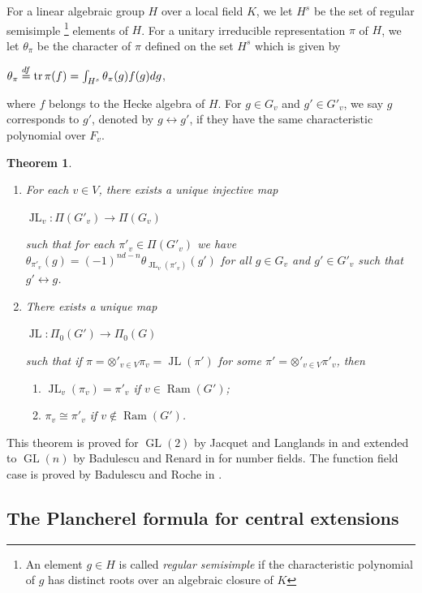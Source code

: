 \documentclass[11pt]{article}
\theoremstyle{plain}
\newtheorem{theorem}{Theorem}[section]
\theoremstyle{remark}
\theoremstyle{definition}
\DeclareMathOperator{\tr}{tr}
\DeclareMathOperator{\GL}{GL}
\DeclareMathOperator{\JL}{JL}
\DeclareMathOperator{\ram}{Ram}
\begin{document}
For a linear algebraic group $H$ over a local field $K$, 
we let $H^s$ be the set of regular semisimple \footnote{An element $g\in H$ is called {\it regular semisimple} if the characteristic polynomial of $g$ has distinct roots over an algebraic closure of $K$} elements of $H$. 
For a unitary irreducible representation $\pi$ of $H$, 
we let $\theta_{\pi}$ be the character of $\pi$ defined on the set $H^s$ which is given by 
\begin{center}
   $\theta_{\pi}\stackrel{\rm df}{=}\tr\pi(f)=\int_{H^s}\theta_{\pi}(g)f(g)dg$,  
\end{center}
where $f$ belongs to the Hecke algebra of $H$.  
For $g\in G_v$ and $g'\in G'_v$, we say $g$ corresponds to $g'$, denoted by $g\leftrightarrow g'$, if they have the same characteristic polynomial over $F_v$. 
\begin{theorem}
\begin{enumerate}
    \item For each $v\in V$, there exists a unique injective map
    \begin{center}
        $\JL_v\colon \Pi(G'_v)\to \Pi(G_v)$
    \end{center}
    such that for each $\pi'_v\in \Pi(G'_v)$ we have $\theta_{\pi'_v}(g)=(-1)^{nd-n}\theta_{\JL_{v}(\pi'_v)}(g')$ for all $g\in G_v$ and $g'\in G'_v$ such that $g'\leftrightarrow g$. 
    \item There exists a unique map 
    \begin{center}
        $\JL\colon \Pi_{0}(G') \to \Pi_{0}(G)$
    \end{center}
    such that if $\pi=\otimes'_{v\in V} \pi_v=\JL(\pi')$ for some $\pi'=\otimes'_{v\in V}\pi'_v$,  
    then
    \begin{enumerate}
        \item $\JL_v(\pi_v)=\pi'_v$ if $v\in \ram(G')$;
        \item $\pi_v\cong \pi'_v$ if $v\notin \ram(G')$. 
    \end{enumerate}
\end{enumerate}
\end{theorem}


This theorem is proved for $\GL(2)$ by Jacquet and Langlands in \cite{JL70} and extended to $\GL(n) $ by Badulescu and Renard in \cite{Badu08,BaduRena10} for number fields.
The function field case is proved by Badulescu and Roche in \cite{BaduRoch2017}.

\subsection{The Plancherel formula for central extensions}\label{B2}
\end{document}
